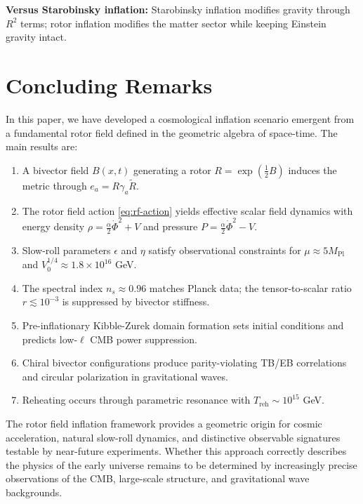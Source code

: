 \documentclass[11pt,a4paper]{article}
\numberwithin{equation}{section}
\theoremstyle{plain}
\theoremstyle{definition}
\theoremstyle{remark}
\begin{document}
\textbf{Versus Starobinsky inflation:} Starobinsky inflation modifies gravity through $R^2$ terms; rotor inflation modifies the matter sector while keeping Einstein gravity intact.

\section{Concluding Remarks}
\label{sec:conclusion}

In this paper, we have developed a cosmological inflation scenario emergent from a fundamental rotor field defined in the geometric algebra of space-time. The main results are:

\begin{enumerate}
  \item A bivector field $B(x,t)$ generating a rotor $R = \exp(\frac{1}{2}B)$ induces the metric through $e_a = R\gamma_a\widetilde{R}$.
  \item The rotor field action \eqref{eq:rf-action} yields effective scalar field dynamics with energy density $\rho = \frac{\alpha}{2}\dot{\Phi}^2 + V$ and pressure $P = \frac{\alpha}{2}\dot{\Phi}^2 - V$.
  \item Slow-roll parameters $\epsilon$ and $\eta$ satisfy observational constraints for $\mu \approx 5M_{\mathrm{Pl}}$ and $V_0^{1/4} \approx 1.8 \times 10^{16}$ GeV.
  \item The spectral index $n_s \approx 0.96$ matches Planck data; the tensor-to-scalar ratio $r \lesssim 10^{-3}$ is suppressed by bivector stiffness.
  \item Pre-inflationary Kibble-Zurek domain formation sets initial conditions and predicts low-$\ell$ CMB power suppression.
  \item Chiral bivector configurations produce parity-violating TB/EB correlations and circular polarization in gravitational waves.
  \item Reheating occurs through parametric resonance with $T_{\mathrm{reh}} \sim 10^{15}$ GeV.
\end{enumerate}

The rotor field inflation framework provides a geometric origin for cosmic acceleration, natural slow-roll dynamics, and distinctive observable signatures testable by near-future experiments. Whether this approach correctly describes the physics of the early universe remains to be determined by increasingly precise observations of the CMB, large-scale structure, and gravitational wave backgrounds.
\end{document}
